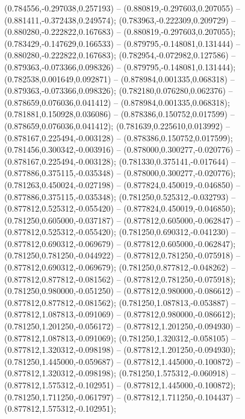  (0.784556,-0.297038,0.257193) -- (0.880819,-0.297603,0.207055) -- (0.881411,-0.372438,0.249574);
 (0.783963,-0.222309,0.209729) -- (0.880280,-0.222822,0.167683) -- (0.880819,-0.297603,0.207055);
 (0.783429,-0.147629,0.166533) -- (0.879795,-0.148081,0.131444) -- (0.880280,-0.222822,0.167683);
 (0.782954,-0.072982,0.127586) -- (0.879363,-0.073366,0.098326) -- (0.879795,-0.148081,0.131444);
 (0.782538,0.001649,0.092871) -- (0.878984,0.001335,0.068318) -- (0.879363,-0.073366,0.098326);
 (0.782180,0.076280,0.062376) -- (0.878659,0.076036,0.041412) -- (0.878984,0.001335,0.068318);
 (0.781881,0.150928,0.036086) -- (0.878386,0.150752,0.017599) -- (0.878659,0.076036,0.041412);
 (0.781639,0.225610,0.013992) -- (0.878167,0.225494,-0.003128) -- (0.878386,0.150752,0.017599);
 (0.781456,0.300342,-0.003916) -- (0.878000,0.300277,-0.020776) -- (0.878167,0.225494,-0.003128);
 (0.781330,0.375141,-0.017644) -- (0.877886,0.375115,-0.035348) -- (0.878000,0.300277,-0.020776);
 (0.781263,0.450024,-0.027198) -- (0.877824,0.450019,-0.046850) -- (0.877886,0.375115,-0.035348);
 (0.781250,0.525312,-0.032793) -- (0.877812,0.525312,-0.055420) -- (0.877824,0.450019,-0.046850);
 (0.781250,0.605000,-0.037187) -- (0.877812,0.605000,-0.062847) -- (0.877812,0.525312,-0.055420);
 (0.781250,0.690312,-0.041230) -- (0.877812,0.690312,-0.069679) -- (0.877812,0.605000,-0.062847);
 (0.781250,0.781250,-0.044922) -- (0.877812,0.781250,-0.075918) -- (0.877812,0.690312,-0.069679);
 (0.781250,0.877812,-0.048262) -- (0.877812,0.877812,-0.081562) -- (0.877812,0.781250,-0.075918);
 (0.781250,0.980000,-0.051250) -- (0.877812,0.980000,-0.086612) -- (0.877812,0.877812,-0.081562);
 (0.781250,1.087813,-0.053887) -- (0.877812,1.087813,-0.091069) -- (0.877812,0.980000,-0.086612);
 (0.781250,1.201250,-0.056172) -- (0.877812,1.201250,-0.094930) -- (0.877812,1.087813,-0.091069);
 (0.781250,1.320312,-0.058105) -- (0.877812,1.320312,-0.098198) -- (0.877812,1.201250,-0.094930);
 (0.781250,1.445000,-0.059687) -- (0.877812,1.445000,-0.100872) -- (0.877812,1.320312,-0.098198);
 (0.781250,1.575312,-0.060918) -- (0.877812,1.575312,-0.102951) -- (0.877812,1.445000,-0.100872);
 (0.781250,1.711250,-0.061797) -- (0.877812,1.711250,-0.104437) -- (0.877812,1.575312,-0.102951);
